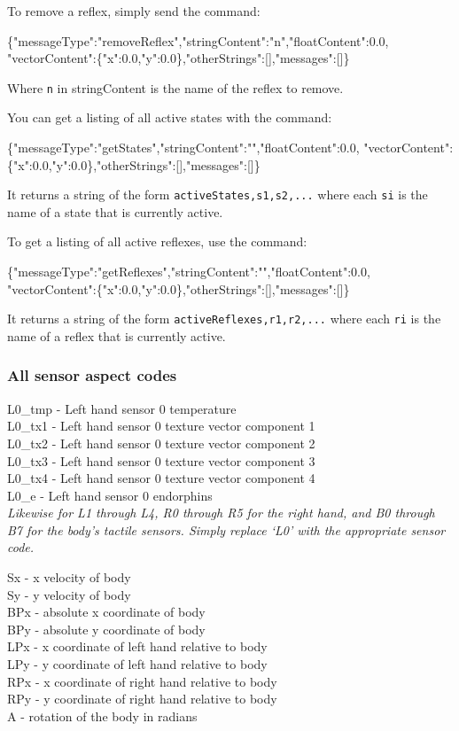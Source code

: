 To remove a reflex, simply send the command:
\begin{center}
	\scriptsize{\{"messageType":"removeReflex","stringContent":"n","floatContent":0.0, "vectorContent":\{"x":0.0,"y":0.0\},"otherStrings":[],"messages":[]\}}
\end{center}
Where \texttt{n} in stringContent is the name of the reflex to remove.

You can get a listing of all active states with the command:
\begin{center}
	\scriptsize{\{"messageType":"getStates","stringContent":"","floatContent":0.0, "vectorContent":\{"x":0.0,"y":0.0\},"otherStrings":[],"messages":[]\}}
\end{center}
 It returns a string of the form \texttt{activeStates,s1,s2,...} where each \texttt{si} is the name of a state that is currently active. 

To get a listing of all active reflexes, use the command:
\begin{center}
	\scriptsize{\{"messageType":"getReflexes","stringContent":"","floatContent":0.0, "vectorContent":\{"x":0.0,"y":0.0\},"otherStrings":[],"messages":[]\}}
\end{center}
It returns a string of the form \texttt{activeReflexes,r1,r2,...} where each \texttt{ri} is the name of a reflex that is currently active.

\subsubsection{All sensor aspect codes}
\label{sect:sensorAspectCodes}

L0\_tmp - Left hand sensor 0 temperature\\
L0\_tx1 - Left hand sensor 0 texture vector component 1\\
L0\_tx2 - Left hand sensor 0 texture vector component 2\\
L0\_tx3 - Left hand sensor 0 texture vector component 3\\
L0\_tx4 - Left hand sensor 0 texture vector component 4\\
L0\_e - Left hand sensor 0 endorphins\\
\textit{Likewise for L1 through L4, R0 through R5 for the right hand, and B0 through B7 for the body's tactile sensors. Simply replace `L0' with the appropriate sensor code.}

\noindent Sx - x velocity of body\\
Sy - y velocity of body\\
BPx - absolute x coordinate of body\\
BPy - absolute y coordinate of body\\
LPx - x coordinate of left hand relative to body\\
LPy - y coordinate of left hand relative to body\\
RPx - x coordinate of right hand relative to body\\
RPy - y coordinate of right hand relative to body\\
A - rotation of the body in radians

